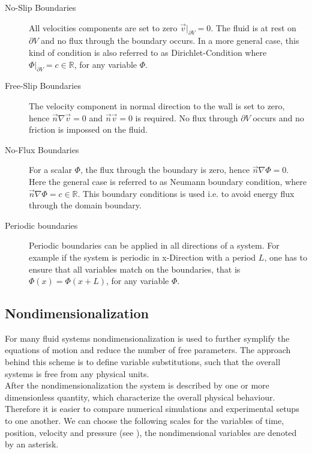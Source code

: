 \begin{description}
    \item[No-Slip Boundaries] All velocities components are set to zero $\vec{v}|_{\partial V} = 0$. The fluid is at rest on $\partial V$ and no flux through
                              the boundary occurs.
                              In a more general case, this kind of condition is  also referred to as Dirichlet-Condition where $\Phi|_{\partial V} = c\in\mathbb{R} $,
                              for any variable $\Phi$.

    \item[Free-Slip Boundaries] The velocity component in normal direction to the wall is set to zero, hence $\vec{n} \nabla \vec{v} = 0$ and $\vec{n}\vec{v}=0$ is required.
                                No flux through $\partial V$ occurs and no friction is impossed on the fluid.

    \item[No-Flux Boundaries] For a scalar $\Phi$, the flux through the boundary is zero, hence $\vec{n}\nabla \Phi = 0$.
                              Here the general case is referred to as Neumann boundary condition, where $\vec{n}\nabla \Phi = c\in \mathbb{R}$.
                              This boundary conditions is used i.e. to avoid energy flux through the domain boundary.

    \item[Periodic boundaries] Periodic boundaries can be applied in all directions of a system. For example if the system is periodic in x-Direction with a period $L$,
                                one has to ensure that all variables match on the boundaries, that is $\Phi(x) = \Phi(x + L)$, for any variable $\Phi$.
\end{description}

\subsection{Nondimensionalization}

For many fluid systems nondimensionalization is used to further symplify the equations of motion and reduce the number of free parameters.
The approach behind this scheme is to define variable substitutions, such that the overall systems is free from any physical units.\\
After the nondimensionalization the system is described by one or more dimensionless quantity, which characterize the overall physical behaviour.
Therefore it is easier to compare numerical simulations and experimental setups to one another.
We can choose the following scales for the variables of time, position, velocity and pressure (see \cite{Kundu2012}), the nondimensional variables are denoted by an asterisk.

